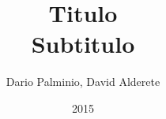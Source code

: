
\title{\Huge 
    \textbf{Titulo}  \\ 
    \huge Subtitulo
    }

\author{Dario Palminio, David Alderete}

\date{2015} 

\maketitle

